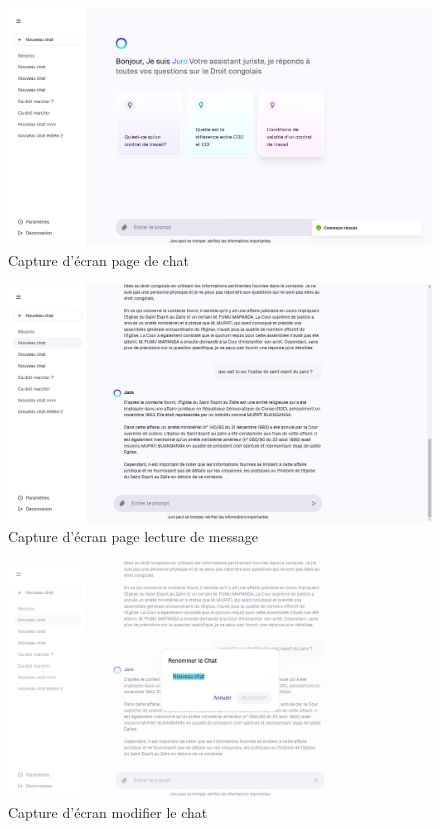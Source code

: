\begin{figure}[H]
    \centering
    \includegraphics[width=15cm]{Images/screenshot-juro-3.png}
    \caption{Capture d'écran page de chat}
    \label{fig:app-screenshot-1}
\end{figure}

\begin{figure}[H]
    \centering
    \includegraphics[width=15cm]{Images/screenshot-juro-4.png}
    \caption{Capture d'écran page lecture de message}
    \label{fig:app-screenshot-1}
\end{figure}

\begin{figure}[H]
    \centering
    \includegraphics[width=15cm]{Images/screenshot-juro-5.png}
    \caption{Capture d'écran modifier le chat}
    \label{fig:app-screenshot-1}
\end{figure}


